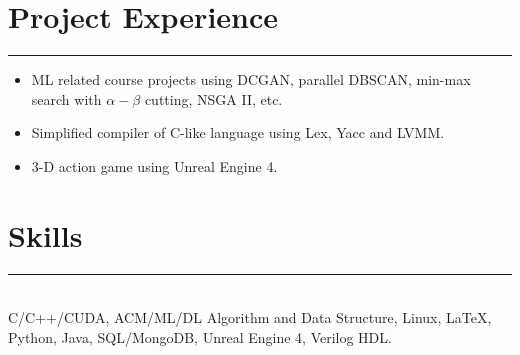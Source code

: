 \documentclass[a4paper]{article}
\begin{document}
		\section*{Project Experience}
		\rule[1pt]{18cm}{0.01em}
		\begin{itemize}
		\item ML related course projects using DCGAN, parallel DBSCAN, min-max search with $ \alpha-\beta $ cutting, NSGA II, etc. 
		\item Simplified compiler of C-like language using Lex, Yacc and LVMM. 
		\item 3-D action game using Unreal Engine 4.
		\end{itemize}
		\section*{Skills}
		\rule[1pt]{18cm}{0.01em}\\
		C/C++/CUDA, ACM/ML/DL Algorithm and Data Structure, Linux, \LaTeX, Python, Java, SQL/MongoDB, Unreal Engine 4, Verilog HDL.
		
	
\end{document}
